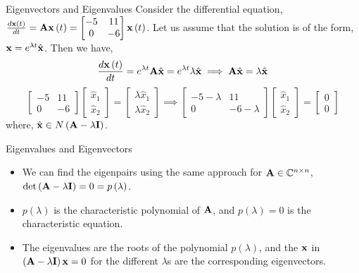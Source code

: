 \documentclass[aspectratio=169]{beamer}
\let\olditem\item
\renewcommand{\item}{\setlength{\itemsep}{\fill}\olditem}
\def\mf{\ensuremath\mathbf}
\def\mb{\ensuremath\mathbb}
\begin{document}
\begin{frame}[t]{Eigenvectors and Eigenvalues}
Consider the differential equation, $\frac{d\mf{x}\left(t\right)}{dt} = \mf{A}\mf{x}\left(t\right) = \begin{bmatrix*}-5 & 11\\0 & -6\end{bmatrix*}\mf{x}\left(t\right)$. Let us assume that the solution is of the form, $\mf{x} = e^{\lambda t}\hat{\mf{x}}$. Then we have,
\[ \frac{d\mf{x}\left(t\right)}{dt} = e^{\lambda t}\mf{A}\hat{\mf{x}} = e^{\lambda t} \lambda \hat{\mf{x}} \implies \mf{A}\hat{\mf{x}} = \lambda \hat{\mf{x}} \]
\[ \begin{bmatrix*}-5 & 11\\0 & -6\end{bmatrix*}\begin{bmatrix*}\hat{x}_1\\\hat{x}_2\end{bmatrix*} = \begin{bmatrix*}\lambda \hat{x}_1\\\lambda \hat{x}_2\end{bmatrix*} \implies \begin{bmatrix*}-5 - \lambda & 11\\0 & -6 - \lambda\end{bmatrix*}\begin{bmatrix*}\hat{x}_1\\\hat{x}_2\end{bmatrix*} = \begin{bmatrix*}0\\0\end{bmatrix*} \]
where, $\hat{\mf{x}} \in N\left(\mf{A} - \lambda\mf{I}\right)$.
\end{frame}


\begin{frame}{Eigenvalues and Eigenvectors}
\begin{itemize}
    \item We can find the eigenpairs using the same approach for $\mf{A} \in \mb{C}^{n \times n}$, $\det \left(\mf{A} - \lambda\mf{I}\right) = 0 = p\left(\lambda\right)$.

    \item $p\left(\lambda\right)$ is the characteristic polynomial of $\mf{A}$, and $p\left(\lambda\right) = 0$ is the characteristic equation.

    \item The eigenvalues are the roots of the polynomial $p\left(\lambda \right)$, and the $\mf{x}$ in $\left(\mf{A} - \lambda\mf{I}\right)\mf{x} = 0$ for the different $\lambda$s are the corresponding eigenvectors. 
\end{itemize}
\end{frame}
\end{document}
